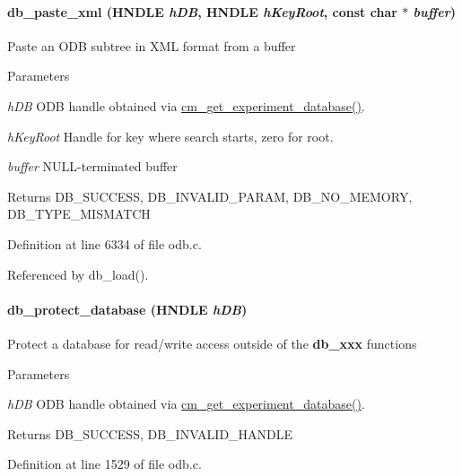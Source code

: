 \paragraph[{db\_\-paste\_\-xml}]{ db\_\-paste\_\-xml (HNDLE {\em hDB}, \/  HNDLE {\em hKeyRoot}, \/  const char $\ast$ {\em buffer})}\hfill\label{group__odbfunctionc_ga7b0051acf49620e36823f55b907dda7a}
Paste an ODB subtree in XML format from a buffer 
\begin{DoxyParams}{Parameters}
\item[{\em hDB}]ODB handle obtained via \hyperlink{group__cmfunctionc_ga16b33b70783a3f5ba98b4094149d12b7}{cm\_\-get\_\-experiment\_\-database()}. \item[{\em hKeyRoot}]Handle for key where search starts, zero for root. \item[{\em buffer}]NULL-\/terminated buffer \end{DoxyParams}
\begin{DoxyReturn}{Returns}
DB\_\-SUCCESS, DB\_\-INVALID\_\-PARAM, DB\_\-NO\_\-MEMORY, DB\_\-TYPE\_\-MISMATCH 
\end{DoxyReturn}


Definition at line 6334 of file odb.c.

Referenced by db\_\-load().
\paragraph[{db\_\-protect\_\-database}]{ db\_\-protect\_\-database (HNDLE {\em hDB})}\hfill\label{group__odbfunctionc_ga959637b6837f613af5a8a3df52af6f3b}
Protect a database for read/write access outside of the {\bfseries db\_\-xxx} functions 
\begin{DoxyParams}{Parameters}
\item[{\em hDB}]ODB handle obtained via \hyperlink{group__cmfunctionc_ga16b33b70783a3f5ba98b4094149d12b7}{cm\_\-get\_\-experiment\_\-database()}. \end{DoxyParams}
\begin{DoxyReturn}{Returns}
DB\_\-SUCCESS, DB\_\-INVALID\_\-HANDLE 
\end{DoxyReturn}


Definition at line 1529 of file odb.c.
